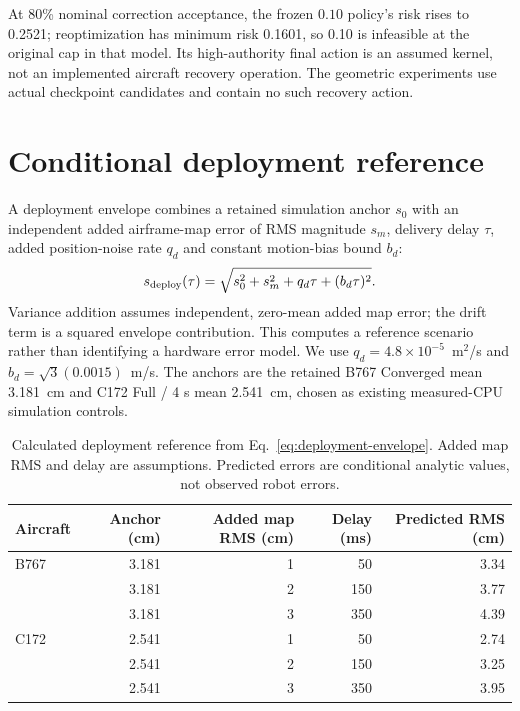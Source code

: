 At 80\% nominal correction acceptance, the frozen $0.10$ policy's risk rises to 0.2521; reoptimization has minimum risk 0.1601, so 0.10 is infeasible at the original cap in that model. Its high-authority final action is an assumed kernel, not an implemented aircraft recovery operation. The geometric experiments use actual checkpoint candidates and contain no such recovery action.

\section{Conditional deployment reference}\label{app:deployment}
A deployment envelope combines a retained simulation anchor $s_0$ with an independent added airframe-map error of RMS magnitude $s_m$, delivery delay $\tau$, added position-noise rate $q_d$ and constant motion-bias bound $b_d$:
\begin{equation}
s_{\rm deploy}(\tau)=\sqrt{s_0^2+s_m^2+q_d\tau+(b_d\tau)^2}.\label{eq:deployment-envelope}
\end{equation}
Variance addition assumes independent, zero-mean added map error; the drift term is a squared envelope contribution. This computes a reference scenario rather than identifying a hardware error model. We use $q_d=4.8\times10^{-5}$~m$^2$/s and $b_d=\sqrt3(0.0015)$~m/s. The anchors are the retained B767 Converged mean 3.181~cm and C172 Full / 4 s mean 2.541~cm, chosen as existing measured-CPU simulation controls.

\begin{table}[t]\centering\small
\caption{Calculated deployment reference from Eq.~\eqref{eq:deployment-envelope}. Added map RMS and delay are assumptions. Predicted errors are conditional analytic values, not observed robot errors.}\label{tab:deployment}
\begin{tabular}{@{}lrrrr@{}}\toprule
Aircraft&Anchor (cm)&Added map RMS (cm)&Delay (ms)&Predicted RMS (cm)\\\midrule
B767&3.181&1&50&3.34\\
&3.181&2&150&3.77\\
&3.181&3&350&4.39\\
C172&2.541&1&50&2.74\\
&2.541&2&150&3.25\\
&2.541&3&350&3.95\\\bottomrule
\end{tabular}
\end{table}


